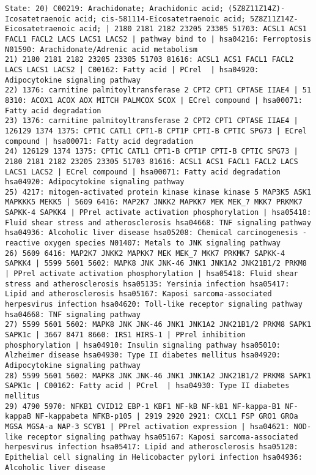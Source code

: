 \begin{lstlisting}[style=QuestionType]
State: 20) C00219: Arachidonate; Arachidonic acid; (5Z8Z11Z14Z)-Icosatetraenoic acid; cis-581114-Eicosatetraenoic acid; 5Z8Z11Z14Z-Eicosatetraenoic acid; | 2180 2181 2182 23205 23305 51703: ACSL1 ACS1 FACL1 FACL2 LACS LACS1 LACS2 | pathway bind to | hsa04216: Ferroptosis N01590: Arachidonate/Adrenic acid metabolism
21) 2180 2181 2182 23205 23305 51703 81616: ACSL1 ACS1 FACL1 FACL2 LACS LACS1 LACS2 | C00162: Fatty acid | PCrel  | hsa04920: Adipocytokine signaling pathway
22) 1376: carnitine palmitoyltransferase 2 CPT2 CPT1 CPTASE IIAE4 | 51 8310: ACOX1 ACOX AOX MITCH PALMCOX SCOX | ECrel compound | hsa00071: Fatty acid degradation
23) 1376: carnitine palmitoyltransferase 2 CPT2 CPT1 CPTASE IIAE4 | 126129 1374 1375: CPT1C CATL1 CPT1-B CPT1P CPTI-B CPTIC SPG73 | ECrel compound | hsa00071: Fatty acid degradation
24) 126129 1374 1375: CPT1C CATL1 CPT1-B CPT1P CPTI-B CPTIC SPG73 | 2180 2181 2182 23205 23305 51703 81616: ACSL1 ACS1 FACL1 FACL2 LACS LACS1 LACS2 | ECrel compound | hsa00071: Fatty acid degradation hsa04920: Adipocytokine signaling pathway
25) 4217: mitogen-activated protein kinase kinase kinase 5 MAP3K5 ASK1 MAPKKK5 MEKK5 | 5609 6416: MAP2K7 JNKK2 MAPKK7 MEK MEK_7 MKK7 PRKMK7 SAPKK-4 SAPKK4 | PPrel activate activation phosphorylation | hsa05418: Fluid shear stress and atherosclerosis hsa04668: TNF signaling pathway hsa04936: Alcoholic liver disease hsa05208: Chemical carcinogenesis - reactive oxygen species N01407: Metals to JNK signaling pathway
26) 5609 6416: MAP2K7 JNKK2 MAPKK7 MEK MEK_7 MKK7 PRKMK7 SAPKK-4 SAPKK4 | 5599 5601 5602: MAPK8 JNK JNK-46 JNK1 JNK1A2 JNK21B1/2 PRKM8 | PPrel activate activation phosphorylation | hsa05418: Fluid shear stress and atherosclerosis hsa05135: Yersinia infection hsa05417: Lipid and atherosclerosis hsa05167: Kaposi sarcoma-associated herpesvirus infection hsa04620: Toll-like receptor signaling pathway hsa04668: TNF signaling pathway
27) 5599 5601 5602: MAPK8 JNK JNK-46 JNK1 JNK1A2 JNK21B1/2 PRKM8 SAPK1 SAPK1c | 3667 8471 8660: IRS1 HIRS-1 | PPrel inhibition phosphorylation | hsa04910: Insulin signaling pathway hsa05010: Alzheimer disease hsa04930: Type II diabetes mellitus hsa04920: Adipocytokine signaling pathway
28) 5599 5601 5602: MAPK8 JNK JNK-46 JNK1 JNK1A2 JNK21B1/2 PRKM8 SAPK1 SAPK1c | C00162: Fatty acid | PCrel  | hsa04930: Type II diabetes mellitus
29) 4790 5970: NFKB1 CVID12 EBP-1 KBF1 NF-kB NF-kB1 NF-kappa-B1 NF-kappaB NF-kappabeta NFKB-p105 | 2919 2920 2921: CXCL1 FSP GRO1 GROa MGSA MGSA-a NAP-3 SCYB1 | PPrel activation expression | hsa04621: NOD-like receptor signaling pathway hsa05167: Kaposi sarcoma-associated herpesvirus infection hsa05417: Lipid and atherosclerosis hsa05120: Epithelial cell signaling in Helicobacter pylori infection hsa04936: Alcoholic liver disease

\end{lstlisting}
